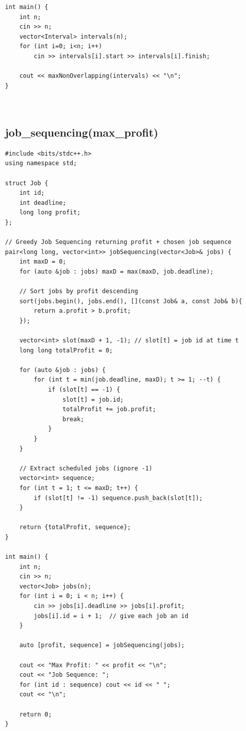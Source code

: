 \documentclass[a4paper,10pt,oneside]{article}
\begin{document}
\begin{multicols*}{\COLS}
\begin{lstlisting}
int main() {
    int n;
    cin >> n;
    vector<Interval> intervals(n);
    for (int i=0; i<n; i++)
        cin >> intervals[i].start >> intervals[i].finish;

    cout << maxNonOverlapping(intervals) << "\n";
}



\end{lstlisting}
\subsection{job_sequencing(max_profit)}
\begin{lstlisting}
#include <bits/stdc++.h>
using namespace std;

struct Job {
    int id;
    int deadline;
    long long profit;
};

// Greedy Job Sequencing returning profit + chosen job sequence
pair<long long, vector<int>> jobSequencing(vector<Job>& jobs) {
    int maxD = 0;
    for (auto &job : jobs) maxD = max(maxD, job.deadline);

    // Sort jobs by profit descending
    sort(jobs.begin(), jobs.end(), [](const Job& a, const Job& b){
        return a.profit > b.profit;
    });

    vector<int> slot(maxD + 1, -1); // slot[t] = job id at time t
    long long totalProfit = 0;

    for (auto &job : jobs) {
        for (int t = min(job.deadline, maxD); t >= 1; --t) {
            if (slot[t] == -1) {
                slot[t] = job.id;
                totalProfit += job.profit;
                break;
            }
        }
    }

    // Extract scheduled jobs (ignore -1)
    vector<int> sequence;
    for (int t = 1; t <= maxD; t++) {
        if (slot[t] != -1) sequence.push_back(slot[t]);
    }

    return {totalProfit, sequence};
}

int main() {
    int n;
    cin >> n;
    vector<Job> jobs(n);
    for (int i = 0; i < n; i++) {
        cin >> jobs[i].deadline >> jobs[i].profit;
        jobs[i].id = i + 1;  // give each job an id
    }

    auto [profit, sequence] = jobSequencing(jobs);

    cout << "Max Profit: " << profit << "\n";
    cout << "Job Sequence: ";
    for (int id : sequence) cout << id << " ";
    cout << "\n";

    return 0;
}


\end{lstlisting}

\end{multicols*}
\end{document}
